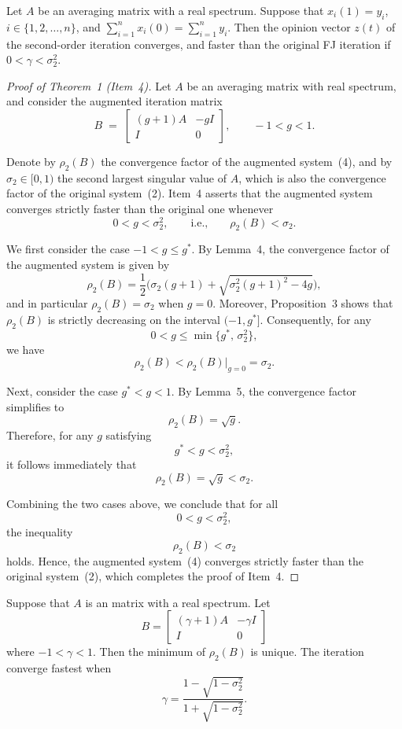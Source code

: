 \documentclass[sigconf,review, nonacm]{acmart}
\newcommand\zz{\boldsymbol{\mathit{z}}}
\newcommand\BB{\boldsymbol{\mathit{B}}}
\newcommand\II{\boldsymbol{\mathit{I}}}
\begin{document}
\begin{theorem}
\label{second-faster}
Let $A$ be an averaging matrix with a real spectrum. Suppose that
$x_i(1) = y_i$, $i \in \{1,2,\ldots,n\}$, and $\sum_{i=1}^{n} x_i(0)
= \sum_{i=1}^{n} y_i$. Then the opinion vector $\zz(t)$ of the second-order iteration
converges, and faster than the original FJ iteration if $0 < \gamma < \sigma_2^{2}$.
\end{theorem}
\begin{proof}[Proof of Theorem~1 (Item~4)]
	Let $A$ be an averaging matrix with real spectrum, and consider the augmented iteration matrix
	\[
	B \;=\;
	\begin{bmatrix}
		(g+1)A & -gI \\
		I      & 0
	\end{bmatrix},
	\qquad -1< g < 1.
	\]
	
	Denote by $\rho_2(B)$ the convergence factor of the augmented system~(4), and by
	$\sigma_2 \in [0,1)$ the second largest singular value of $A$, which is also the convergence
	factor of the original system~(2).
	Item~4 asserts that the augmented system converges strictly faster than the original one
	whenever
	\[
	0 < g < \sigma_2^2,
	\qquad \text{i.e.,} \qquad
	\rho_2(B) < \sigma_2.
	\]
	
	We first consider the case $-1 < g \le g^*$.
	By Lemma~4, the convergence factor of the augmented system is given by
	\[
	\rho_2(B)
	=
	\frac{1}{2}
	\Big(
	\sigma_2 (g+1)
	+
	\sqrt{\sigma_2^2 (g+1)^2 - 4g}
	\Big),
	\]
	and in particular $\rho_2(B) = \sigma_2$ when $g=0$.
	Moreover, Proposition~3 shows that $\rho_2(B)$ is strictly decreasing on the interval
	$(-1, g^*]$.
	Consequently, for any
	\[
	0 < g \le \min\{g^*,\, \sigma_2^2\},
	\]
	we have
	\[
	\rho_2(B)
	<
	\rho_2(B)\big|_{g=0}
	=
	\sigma_2.
	\]
	
	Next, consider the case $g^* < g < 1$.
	By Lemma~5, the convergence factor simplifies to
	\[
	\rho_2(B) = \sqrt{g}.
	\]
	Therefore, for any $g$ satisfying
	\[
	g^* < g < \sigma_2^2,
	\]
	it follows immediately that
	\[
	\rho_2(B) = \sqrt{g} < \sigma_2.
	\]
	
	Combining the two cases above, we conclude that for all
	\[
	0 < g < \sigma_2^2,
	\]
	the inequality
	\[
	\rho_2(B) < \sigma_2
	\]
	holds. Hence, the augmented system~(4) converges strictly faster than the original
	system~(2), which completes the proof of Item~4.
\end{proof}



\begin{proposition}
Suppose that $A$ is an matrix with a real spectrum. Let
\[
\BB =
\begin{bmatrix}
(\gamma+1)A & -\gamma \II \\
\II      & 0
\end{bmatrix}
\]
where $-1 < \gamma < 1$. Then the minimum of $\rho_2(B)$ is unique.
The iteration converge fastest when
\begin{equation}
\gamma = \frac{1 - \sqrt{1 - \sigma_2^{2}}}{1 + \sqrt{1 - \sigma_2^{2}}}.
\end{equation}
\end{proposition}
\end{document}
